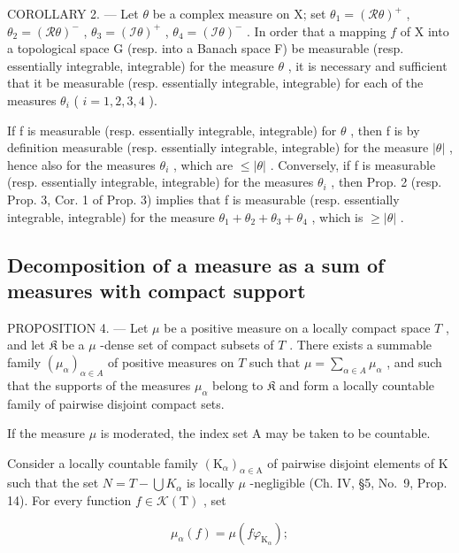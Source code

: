 COROLLARY 2. --- Let \(\theta\) be a complex measure on X; set \(\theta_1 = (\mathcal{R}\theta)^+\) , \(\theta_2 = (\mathcal{R}\theta)^-\) , \(\theta_3 = (\mathcal{I}\theta)^+\) , \(\theta_4 = (\mathcal{I}\theta)^-\) . In order that a mapping \(f\) of X into a topological space G (resp. into a Banach space F) be measurable (resp. essentially integrable, integrable) for the measure \(\theta\) , it is necessary and sufficient that it be measurable (resp. essentially integrable, integrable) for each of the measures \(\theta_i\) ( \(i = 1,2,3,4\) ).

If f is measurable (resp. essentially integrable, integrable) for \(\theta\) , then f is by definition measurable (resp. essentially integrable, integrable) for the measure \(|\theta|\) , hence also for the measures \(\theta_{i}\) , which are \(\leqslant |\theta|\) . Conversely, if f is measurable (resp. essentially integrable, integrable) for the measures \(\theta_{i}\) , then Prop. 2 (resp. Prop. 3, Cor. 1 of Prop. 3) implies that f is measurable (resp. essentially integrable, integrable) for the measure \(\theta_{1} + \theta_{2} + \theta_{3} + \theta_{4}\) , which is \(\geqslant |\theta|\) .

\subsection{Decomposition of a measure as a sum of measures with compact support}

PROPOSITION 4. --- Let \(\mu\) be a positive measure on a locally compact space \(T\) , and let \(\mathfrak{K}\) be a \(\mu\) -dense set of compact subsets of \(T\) . There exists a summable family \((\mu_{\alpha})_{\alpha \in A}\) of positive measures on \(T\) such that \(\mu = \sum_{\alpha \in A} \mu_{\alpha}\) , and such that the supports of the measures \(\mu_{\alpha}\) belong to \(\mathfrak{K}\) and form a locally countable family of pairwise disjoint compact sets.

If the measure \(\mu\) is moderated, the index set A may be taken to be countable.

Consider a locally countable family \((\mathrm{K}_{\alpha})_{\alpha\in\mathrm{A}}\) of pairwise disjoint elements of K such that the set \(N = T - \bigcup K_{\alpha}\) is locally \(\mu\) -negligible (Ch. IV, §5, No.~9, Prop. 14). For every function \(f \in \mathcal{K}(\mathrm{T})\) , set

\[
\mu_ {\alpha} (f) = \mu (f \varphi_ {\mathrm{K} _ {\alpha}});
\]


